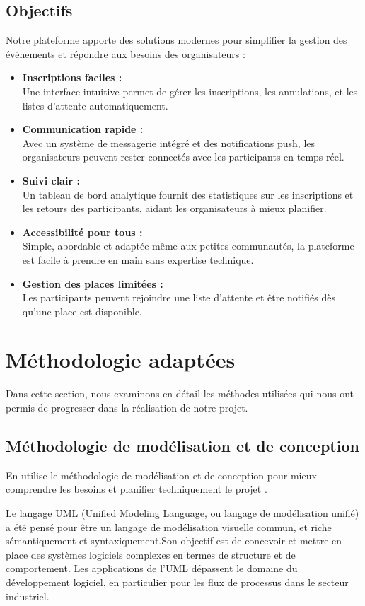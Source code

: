 \subsection{Objectifs}
Notre plateforme apporte des solutions modernes pour simplifier la gestion des événements et répondre aux besoins des organisateurs :
\begin{itemize}[label=$\star$]
  \item \textbf{Inscriptions faciles :} \\
  Une interface intuitive permet de gérer les inscriptions, les annulations, et les listes d’attente automatiquement.
  \item \textbf{Communication rapide :} \\
  Avec un système de messagerie intégré et des notifications push, les organisateurs peuvent rester connectés avec les participants en temps réel.
  \item \textbf{Suivi clair :} \\
  Un tableau de bord analytique fournit des statistiques sur les inscriptions et les retours des participants, aidant les organisateurs à mieux planifier.
  \item \textbf{Accessibilité pour tous :} \\
  Simple, abordable et adaptée même aux petites communautés, la plateforme est facile à prendre en main sans expertise technique.
  \item \textbf{Gestion des places limitées :} \\
  Les participants peuvent rejoindre une liste d’attente et être notifiés dès qu’une place est disponible.
\end{itemize}
\section {Méthodologie adaptées}
Dans cette section, nous examinons en détail les méthodes utilisées qui nous ont permis de progresser dans la réalisation de notre projet.
\subsection{Méthodologie de modélisation et de conception}
En utilise le méthodologie de modélisation et de conception  pour mieux comprendre les besoins et planifier techniquement le projet .

Le langage UML (Unified Modeling Language, ou langage de modélisation unifié) a été pensé pour être un langage de modélisation visuelle commun, et riche sémantiquement et syntaxiquement.Son objectif est de concevoir et mettre en place des systèmes logiciels complexes en termes de structure et de comportement. Les applications de l’UML dépassent le domaine du développement logiciel, en particulier pour les flux de processus dans le secteur industriel.\cite{ref1}
